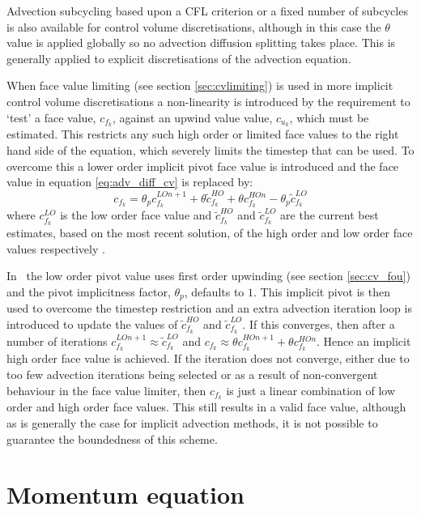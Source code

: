 Advection subcycling based upon a CFL criterion or a fixed number of subcycles is also available for control volume discretisations, although in this case the $\theta$ value is applied globally so no advection diffusion splitting takes place.  This is generally applied to explicit discretisations of the advection equation.

When face value limiting (see section \ref{sec:cvlimiting}) is used in more implicit control volume discretisations a non-linearity is introduced by the requirement to `test' a face value, $c_{f_k}$, against an upwind value value, $c_{u_k}$, which must be estimated.  This restricts any such high order or limited face values to the right hand side of the equation, which severely limits the timestep that can be used.  To overcome this a lower order implicit pivot face value is introduced and the face value in equation \ref{eq:adv_diff_cv} is replaced by:
\begin{equation}
c_{f_k} = \theta_p c_{f_k}^{LO n+1} + \theta \tilde{c}_{f_k}^{HO} + \theta c_{f_k}^{HO n} - \theta_p \tilde{c}_{f_k}^{LO}
\end{equation}
where $c_{f_k}^{LO}$ is the low order face value and $\tilde{c}_{f_k}^{HO}$ and $\tilde{c}_{f_k}^{LO}$ are the current best estimates, based on the most recent solution, of the high order and low order face values respectively \citep[see ][ for further details]{leveque_finite-volume_2002}.

In \fluidity\ the low order pivot value uses first order upwinding (see section \ref{sec:cv_fou}) and the pivot implicitness factor, $\theta_p$, defaults to $1$.  This implicit pivot is then used to overcome the timestep restriction and an extra advection iteration loop is introduced to update the values of $\tilde{c}_{f_k}^{HO}$ and $\tilde{c}_{f_k}^{LO}$.  If this converges, then after a number of iterations $c_{f_k}^{LO n+1} \approx \tilde{c}_{f_k}^{LO}$ and $c_{f_k} \approx \theta c_{f_k}^{HO n+1} + \theta c_{f_k}^{HO n}$.  Hence an implicit high order face value is achieved.  If the iteration does not converge, either due to too few advection iterations being selected or as a result of non-convergent behaviour in the face value limiter, then $c_{f_k}$ is just a linear combination of low order and high order face values.  This still results in a valid face value, although as is generally the case for implicit advection methods, it is not possible to guarantee the boundedness of this scheme.

\section{Momentum equation}

